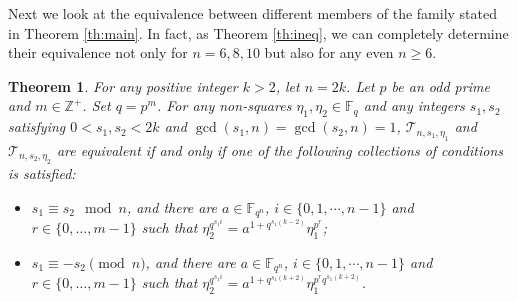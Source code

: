 \documentclass{amsart}
\theoremstyle{plain}
\newtheorem{theorem}{Theorem}[section]
\theoremstyle{definition}
\newcommand{\F}{\mathbb F}
\newcommand{\fqn}{\mathbb{F}_{q^n}}
\newcommand{\cT}{\mathcal{T}}
\begin{document}
	Next we look at the equivalence between different members of the family stated in Theorem \ref{th:main}. In fact, as Theorem \ref{th:ineq}, we can completely determine their equivalence not only for $n=6,8,10$ but also for any even $n\geq 6$.
	\begin{theorem}\label{th:equi_members}
		For any positive integer $k>2$, let $n=2k$. Let $p$ be an odd prime and $m\in \mathbb{Z}^+$. Set $q=p^m$. For any non-squares $\eta_1,\eta_2\in \F_q$ and any integers $s_1,s_2$ satisfying $0<s_1,s_2<2k$ and $\gcd(s_1,n)=\gcd(s_2,n)=1$, $\cT_{n,s_1, \eta_1}$ and $\cT_{n,s_2, \eta_2}$ are equivalent if and only if
		one of the following collections of conditions is satisfied:
		\begin{itemize}
			\item[(a)]
			$s_1\equiv s_2\mod n$, and there are $a\in\fqn$, $i\in\{0,1,\cdots,n-1\}$ and $r \in \{0,\dots,m-1\}$ such that   $\eta_2^{q^{s_1i}}=a^{1+q^{s_1(k-2)}}\eta_1^{p^r}$;
			\item[(b)] 
			$s_1\equiv- s_2\pmod{n}$, and there are $a\in\fqn$, $i\in\{0,1,\cdots,n-1\}$ and $r \in \{0,\dots,m-1\}$ such that  $\eta_2^{q^{s_1i}}=a^{1+q^{s_1(k+2)}}\eta_1^{p^r q^{s_1(k+2)}}$.
		\end{itemize} 
	\end{theorem}
\end{document}
